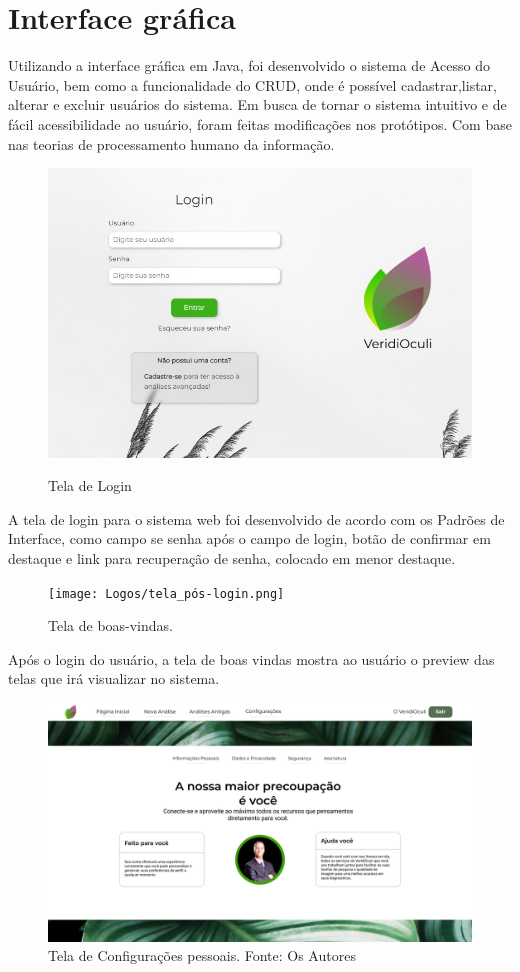\documentclass[
  a4paper,%
  12pt,%
  english,%
  brazilian,%
]{article}
\begin{document}
\section*{Interface gráfica}

Utilizando a interface gráfica em Java, foi desenvolvido o sistema de Acesso do Usuário, bem como a funcionalidade do CRUD, onde é possível cadastrar,listar, alterar e excluir usuários do sistema.
Em busca de tornar o sistema intuitivo e de fácil acessibilidade ao usuário, foram feitas modificações nos protótipos. Com base nas teorias de processamento humano da informação.

\begin{figure}[H]
    \centering
    \caption{Tela de Login}
    \includegraphics[width=.7\textwidth,keepaspectratio]{Logos/1.jpg}
    \label{fig:enter-label}
\end{figure}

A tela de login para o sistema web foi desenvolvido de acordo com os Padrões de Interface, como campo se senha após o campo de login, botão de confirmar em destaque e link para recuperação de senha, colocado em menor destaque.

\begin{figure}[H]
    \centering
    \caption{Tela de boas-vindas.}
    \texttt{[image: Logos/tela\_pós-login.png]}
    \label{fig:my_label}
\end{figure}


Após o login do usuário, a tela de boas vindas mostra ao usuário o preview das telas que irá visualizar no sistema. 

\begin{figure}[H]
    \centering
    \includegraphics[width=.7\textwidth,keepaspectratio]{Logos/tela_configurações2.png}
    \caption{Tela de Configurações pessoais. Fonte: Os Autores}
    \label{fig:my_label}
\end{figure}
\end{document}
